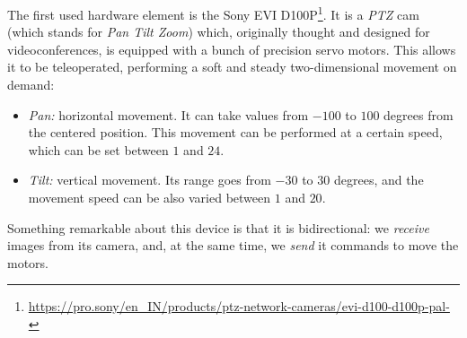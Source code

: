 		The first used hardware element is the Sony EVI D100P\footnote{\url{https://pro.sony/en_IN/products/ptz-network-cameras/evi-d100-d100p-pal-}}. It is a \emph{PTZ} cam (which stands for \emph{Pan Tilt Zoom}) which, originally thought and designed for videoconferences, is equipped with a bunch of precision servo motors. This allows it to be teleoperated, performing a soft and steady two-dimensional movement on demand:
		\begin{itemize}
			\item \emph{Pan:} horizontal movement. It can take values from $-100$ to $100$ degrees from the centered position. This movement can be performed at a certain speed, which can be set between $1$ and $24$.

			\item \emph{Tilt:} vertical movement. Its range goes from $-30$ to $30$ degrees, and the movement speed can be also varied between $1$ and $20$.
		\end{itemize}
		
		Something remarkable about this device is that it is bidirectional: we \textit{receive} images from its camera, and, at the same time, we \textit{send} it commands to move the motors.\\
		
